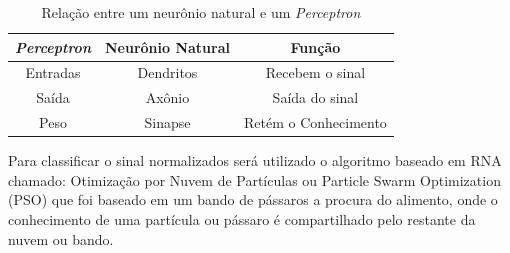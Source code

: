 \documentclass[conference]{IEEEtran}
\begin{document}
\renewcommand\tablename{TABELA}
\begin{table}[!t]
	\renewcommand{\arraystretch}{1.3}
	\caption{Relação entre um neurônio natural e um \textit{Perceptron}}
	\label{table:tabelaComparativa}
	\centering
	\begin{tabular}{|c|c|c|}
		\hline
		\textbf{\textit{Perceptron}} & \textbf{Neurônio Natural} & \textbf{Função}\\
		\hline
		Entradas & Dendritos & Recebem o sinal \\		
		\hline
		Saída & Axônio & Saída do sinal \\		
		\hline
		Peso & Sinapse & Retém o Conhecimento \\		
		\hline
	\end{tabular}
\end{table}

 
Para classificar o sinal normalizados será utilizado o algoritmo baseado em RNA chamado: Otimização por Nuvem de Partículas ou Particle Swarm Optimization (PSO) que foi baseado em um bando de pássaros a procura do alimento, onde o conhecimento de uma partícula ou pássaro é compartilhado pelo restante da nuvem ou bando.



       


%
%
\end{document}
